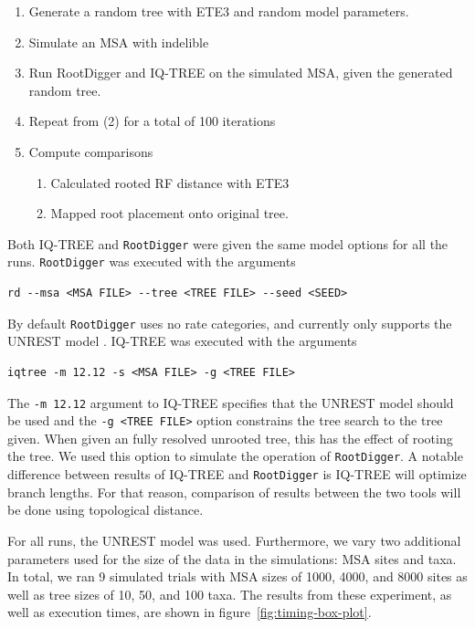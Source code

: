 \documentclass{article}
\newcommand{\RootDiggertt}{\texttt{RootDigger}}
\begin{document}
\begin{enumerate} 
  \item Generate a random tree with ETE3
        \cite{huerta-cepas_ete_2016} and random model parameters.
  \item Simulate an MSA with indelible \cite{fletcher_indelible:_2009}
  \item Run RootDigger and IQ-TREE \cite{minh_iq-tree_2019} on the simulated
        MSA, given the generated random tree.
    \item Repeat from (2) for a total of 100 iterations
  \item Compute comparisons
        \begin{enumerate}
          \item Calculated rooted RF distance with ETE3
                \cite{robinson_comparison_1981}
          \item Mapped root placement onto original tree.
        \end{enumerate}
\end{enumerate}

Both IQ-TREE and \RootDiggertt{} were given the same model options for all the
runs. \RootDiggertt{} was executed with the arguments

\begin{verbatim}
rd --msa <MSA FILE> --tree <TREE FILE> --seed <SEED>
\end{verbatim}

By default \RootDiggertt{} uses no rate categories, and currently only supports
the UNREST model \cite{yang_estimating_1994}. IQ-TREE was executed with the
arguments

\begin{verbatim}
iqtree -m 12.12 -s <MSA FILE> -g <TREE FILE>
\end{verbatim}

The \texttt{-m 12.12} argument to IQ-TREE specifies that the UNREST model should
be used \cite{woodhams_new_2015} and the \texttt{-g <TREE FILE>} option
constrains the tree search to the tree given. When given an fully resolved
unrooted tree, this has the effect of rooting the tree. We used this option to
simulate the operation of \RootDiggertt{}. A notable difference between results
of IQ-TREE and \RootDiggertt{} is IQ-TREE will optimize branch lengths. For that
reason, comparison of results between the two tools will be done using
topological distance.

For all runs, the UNREST model was used. Furthermore, we vary two additional
parameters used for the size of the data in the simulations: MSA sites and taxa.
In total, we ran 9 simulated trials with MSA sizes of 1000, 4000, and 8000 sites
as well as tree sizes of 10, 50, and 100 taxa. The results from these
experiment, as well as execution times, are shown in
figure~\ref{fig:timing-box-plot}.
\end{document}

